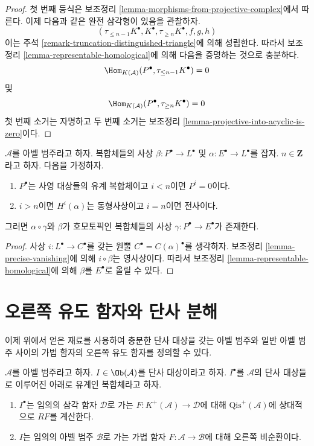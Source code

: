 \begin{proof}
첫 번째 등식은 보조정리 \ref{lemma-morphisms-from-projective-complex}에서 따른다.
이제 다음과 같은 완전 삼각형이 있음을 관찰하자.
$$
(\tau_{\leq n - 1}K^\bullet, K^\bullet, \tau_{\geq n}K^\bullet, f, g, h)
$$
이는 주석 \ref{remark-truncation-distinguished-triangle}에 의해 성립한다.
따라서 보조정리 \ref{lemma-representable-homological}에 의해
다음을 증명하는 것으로 충분하다.
$$
\Hom_{K(\mathcal{A})}(P^\bullet, \tau_{\leq n - 1}K^\bullet) = 0
$$
및
$$
\Hom_{K(\mathcal{A})}(P^\bullet, \tau_{\geq n} K^\bullet) = 0
$$
첫 번째 소거는 자명하고 두 번째 소거는
보조정리 \ref{lemma-projective-into-acyclic-is-zero}이다.
\end{proof}

\begin{lemma}
\label{lemma-lift-map}
$\mathcal{A}$를 아벨 범주라고 하자.
복합체들의 사상 $\beta : P^\bullet \to L^\bullet$ 및
$\alpha : E^\bullet \to L^\bullet$를 잡자.
$n \in \mathbf{Z}$라고 하자. 다음을 가정하자.
\begin{enumerate}
\item $P^\bullet$는 사영 대상들의 유계 복합체이고 $i < n$이면
$P^i = 0$이다.
\item $i > n$이면 $H^i(\alpha)$는 동형사상이고 $i = n$이면 전사이다.
\end{enumerate}
그러면 $\alpha \circ \gamma$와 $\beta$가 호모토픽인 복합체들의 사상
$\gamma : P^\bullet \to E^\bullet$가 존재한다.
\end{lemma}

\begin{proof}
사상 $i : L^\bullet \to C^\bullet$를 갖는 원뿔
$C^\bullet = C(\alpha)^\bullet$를 생각하자.
보조정리 \ref{lemma-precise-vanishing}에 의해 $i \circ \beta$는 영사상이다.
따라서 보조정리 \ref{lemma-representable-homological}에 의해
$\beta$를 $E^\bullet$로 올릴 수 있다.
\end{proof}


\section{오른쪽 유도 함자와 단사 분해}
\label{section-right-derived-functor}

\noindent
이제 위에서 얻은 재료를 사용하여 충분한 단사 대상을 갖는 아벨 범주와
일반 아벨 범주 사이의 가법 함자의 오른쪽 유도 함자를 정의할 수 있다.

\begin{lemma}
\label{lemma-injective-acyclic}
$\mathcal{A}$를 아벨 범주라고 하자.
$I \in \Ob(\mathcal{A})$를 단사 대상이라고 하자.
$I^\bullet$를 $\mathcal{A}$의 단사 대상들로 이루어진 아래로 유계인
복합체라고 하자.
\begin{enumerate}
\item $I^\bullet$는 임의의 삼각 함자 $\mathcal{D}$로 가는
$F : K^{+}(\mathcal{A}) \to \mathcal{D}$에 대해
$\text{Qis}^{+}(\mathcal{A})$에 상대적으로 $RF$를 계산한다.
\item $I$는 임의의 아벨 범주 $\mathcal{B}$로 가는 가법 함자
$F : \mathcal{A} \to \mathcal{B}$에 대해 오른쪽 비순환이다.
\end{enumerate}
\end{lemma}

